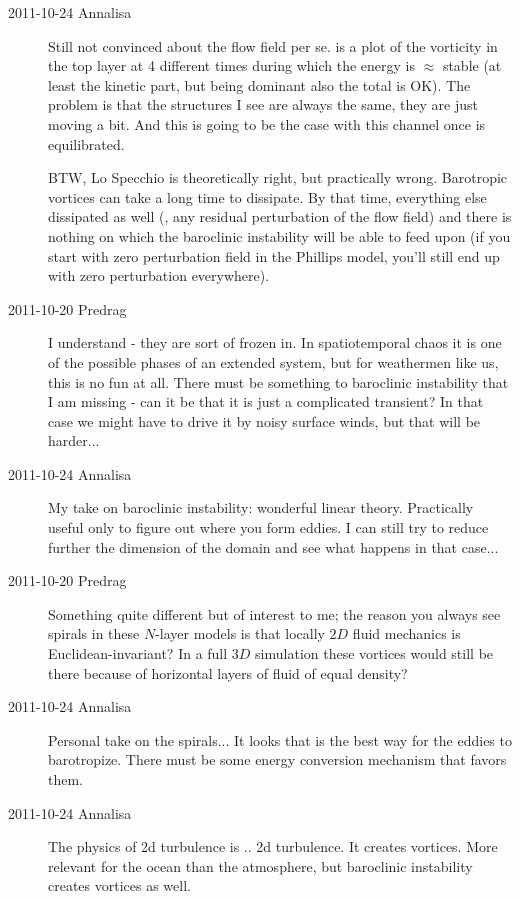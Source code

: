 \begin{description}
\item[2011-10-24 Annalisa]
Still not convinced about the flow field per se. 
is a plot of the vorticity in the top layer at 4 different times during
which the energy is $\approx$ stable (at least the kinetic part, but
being dominant also the total is OK). The problem is that the structures I
see are always the same, they are just moving a bit. And this is going to
be the case with this channel once is equilibrated.

BTW, Lo Specchio  is theoretically right, but practically wrong.
Barotropic vortices can take a long time to dissipate. By that time,
everything else dissipated as well (\ie, any residual perturbation of the
flow field) and there is nothing on which the baroclinic instability will
be able to feed upon (if you start with zero perturbation field in the
Phillips model, you'll still end up with zero perturbation everywhere).

\item[2011-10-20 Predrag] I understand - they are sort of frozen in. In
spatiotemporal chaos it is one of the possible phases of an extended
system, but for weathermen like us, this is no fun at all. There must be
something to baroclinic instability that I am missing - can it be that it
is just a complicated transient? In that case we might have to drive it
by noisy surface winds, but that will be harder...

\item[2011-10-24 Annalisa]
My take on baroclinic instability: wonderful linear theory. Practically
useful only to figure out where you form eddies. I can still try to
reduce further the dimension of the domain and see what happens in that
case...

\item[2011-10-20 Predrag] Something quite different but of interest to me;
the reason you always see spirals in these $N$-layer models is that locally
$2D$ fluid mechanics is Euclidean-invariant? In a full $3D$ simulation these
vortices would still be there because of horizontal layers of fluid of equal density?

\item[2011-10-24 Annalisa]
Personal take on the spirals... It looks that is the best way for the
eddies to barotropize. There must be some energy conversion mechanism
that favors them.

\item[2011-10-24 Annalisa]
The physics of 2d turbulence is .. 2d turbulence. It creates vortices.
More relevant for the ocean than the atmosphere, but baroclinic
instability creates vortices as well.

\end{description}
